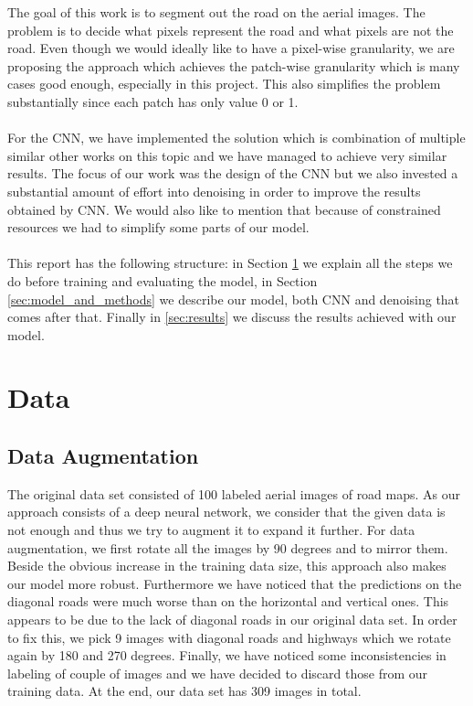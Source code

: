 \documentclass[10pt,conference,compsocconf]{IEEEtran}
\begin{document}
The goal of this work is to segment out the road on the aerial images. The problem is to decide what pixels
represent the road and what pixels are not the road. Even though we would ideally like to have a pixel-wise
granularity, we are proposing the approach which achieves the patch-wise granularity which is many cases good enough,
especially in this project. This also simplifies the problem substantially since each patch has only value 0 or 1. \\
\\
For the CNN, we have implemented the solution which is combination of multiple similar other works on this topic 
and we have managed to achieve very similar results. The focus of our work was the design of the
CNN but we also invested a substantial amount of effort into denoising in order
to improve the results obtained by CNN. We would also like to mention that because of constrained resources
we had to simplify some parts of our model.\\
\\
This report has the following structure: in Section \ref{sec:Data} we explain all the steps we do before training
and evaluating the model, in Section \ref{sec:model_and_methods} we describe our model, both CNN and denoising
that comes after that. Finally in \ref{sec:results} we discuss the results achieved with our model.


\section{Data}
\label{sec:Data}

\subsection{Data Augmentation}
\label{sec:data_aug}
The original data set consisted of 100 labeled aerial images of road maps. As our approach consists of a
deep neural network, we consider that the given data is not enough and thus we try to augment it to expand it further.
For data augmentation, we first rotate all the images by 90 degrees and to mirror them. Beside the obvious increase
in the training data size, this approach also makes our model more robust. Furthermore we have noticed that the 
predictions on the diagonal roads were much worse than on the horizontal and vertical ones. This appears to be due to
the lack of diagonal roads in our original data set. In order to fix this, we pick 9 images with diagonal
roads and highways which we rotate again by 180 and 270 degrees. Finally, we have noticed some inconsistencies
in labeling of couple of images and we have decided to discard those from our training data. At the end, our data set
has 309 images in total.
\end{document}
